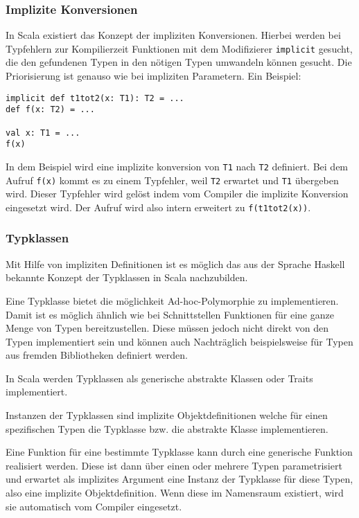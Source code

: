 \subsubsection{Implizite Konversionen}

In Scala existiert das Konzept der impliziten Konversionen. Hierbei werden bei 
Typfehlern zur Kompilierzeit Funktionen mit dem Modifizierer \texttt{implicit} 
gesucht, die den gefundenen Typen in den nötigen Typen umwandeln können gesucht. 
Die Priorisierung ist genauso wie bei impliziten Parametern. Ein Beispiel:

\begin{lstlisting}
implicit def t1tot2(x: T1): T2 = ...
def f(x: T2) = ...

val x: T1 = ...
f(x)
\end{lstlisting}

In dem Beispiel wird eine implizite konversion von \texttt{T1} nach \texttt{T2} 
definiert. Bei dem Aufruf \texttt{f(x)} kommt es zu einem Typfehler, weil 
\texttt{T2} erwartet und \texttt{T1} übergeben wird. Dieser Typfehler wird 
gelöst indem vom Compiler die implizite Konversion eingesetzt wird. Der Aufruf 
wird also intern erweitert zu \texttt{f(t1tot2(x))}.

\subsubsection{Typklassen}

Mit Hilfe von impliziten Definitionen ist es möglich das aus der Sprache Haskell 
bekannte Konzept der Typklassen in Scala nachzubilden. 

Eine Typklasse bietet die möglichkeit Ad-hoc-Polymorphie zu implementieren. 
Damit ist es möglich ähnlich wie bei Schnittstellen Funktionen für eine ganze 
Menge von Typen bereitzustellen. Diese müssen jedoch nicht direkt von den Typen 
implementiert sein und können auch Nachträglich beispielsweise für Typen aus 
fremden Bibliotheken definiert werden.

In Scala werden Typklassen als generische abstrakte Klassen oder Traits 
implementiert.

Instanzen der Typklassen sind implizite Objektdefinitionen welche für einen 
spezifischen Typen die Typklasse bzw. die abstrakte Klasse implementieren.

Eine Funktion für eine bestimmte Typklasse kann durch eine generische Funktion 
realisiert werden. Diese ist dann über einen oder mehrere Typen parametrisiert 
und erwartet als implizites Argument eine Instanz der Typklasse für diese Typen, 
also eine implizite Objektdefinition. Wenn diese im Namensraum existiert, wird 
sie automatisch vom Compiler eingesetzt.


